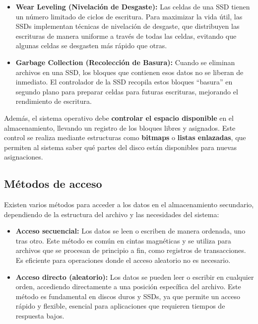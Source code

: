 \begin{itemize}
	\item \textbf{Wear Leveling (Nivelación de Desgaste):} Las celdas de una SSD tienen un número limitado de ciclos de escritura. Para maximizar la vida útil, las SSDs implementan técnicas de nivelación de desgaste, que distribuyen las escrituras de manera uniforme a través de todas las celdas, evitando que algunas celdas se desgasten más rápido que otras.
	\item \textbf{Garbage Collection (Recolección de Basura):} Cuando se eliminan archivos en una SSD, los bloques que contienen esos datos no se liberan de inmediato. El controlador de la SSD recopila estos bloques ``basura'' en segundo plano para preparar celdas para futuras escrituras, mejorando el rendimiento de escritura.
\end{itemize}

Además, el sistema operativo debe \textbf{controlar el espacio disponible} en el almacenamiento, llevando un registro de los bloques libres y asignados. Este control se realiza mediante estructuras como \textbf{bitmaps} o \textbf{listas enlazadas}, que permiten al sistema saber qué partes del disco están disponibles para nuevas asignaciones.



\subsection{Métodos de acceso}

Existen varios métodos para acceder a los datos en el almacenamiento secundario, dependiendo de la estructura del archivo y las necesidades del sistema:

\begin{itemize}
	\item \textbf{Acceso secuencial:} Los datos se leen o escriben de manera ordenada, uno tras otro. Este método es común en cintas magnéticas y se utiliza para archivos que se procesan de principio a fin, como registros de transacciones. Es eficiente para operaciones donde el acceso aleatorio no es necesario.
	\item \textbf{Acceso directo (aleatorio):} Los datos se pueden leer o escribir en cualquier orden, accediendo directamente a una posición específica del archivo. Este método es fundamental en discos duros y SSDs, ya que permite un acceso rápido y flexible, esencial para aplicaciones que requieren tiempos de respuesta bajos.
\end{itemize}

